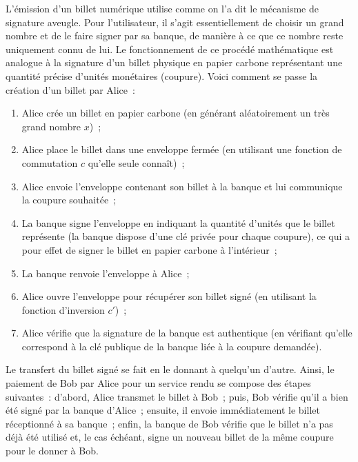L'émission d'un billet numérique utilise comme on l'a dit le mécanisme de signature aveugle. Pour l'utilisateur, il s'agit essentiellement de choisir un grand nombre et de le faire signer par sa banque, de manière à ce que ce nombre reste uniquement connu de lui. Le fonctionnement de ce procédé mathématique est analogue à la signature d'un billet physique en papier carbone représentant une quantité précise d'unités monétaires (coupure). Voici comment se passe la création d'un billet par Alice~:

\begin{enumerate}
\item Alice crée un billet en papier carbone (en générant aléatoirement un très grand nombre $x$)~;
\item Alice place le billet dans une enveloppe fermée (en utilisant une fonction de commutation $c$ qu'elle seule connaît)~;
\item Alice envoie l'enveloppe contenant son billet à la banque et lui communique la coupure souhaitée~;
\item La banque signe l'enveloppe en indiquant la quantité d'unités que le billet représente (la banque dispose d'une clé privée pour chaque coupure), ce qui a pour effet de signer le billet en papier carbone à l'intérieur~;
\item La banque renvoie l'enveloppe à Alice~;
\item Alice ouvre l'enveloppe pour récupérer son billet signé (en utilisant la fonction d'inversion $c'$)~;
\item Alice vérifie que la signature de la banque est authentique (en vérifiant qu'elle correspond à la clé publique de la banque liée à la coupure demandée).
\end{enumerate}

Le transfert du billet signé se fait en le donnant à quelqu'un d'autre. Ainsi, le paiement de Bob par Alice pour un service rendu se compose des étapes suivantes~: d'abord, Alice transmet le billet à Bob~; puis, Bob vérifie qu'il a bien été signé par la banque d'Alice~; ensuite, il envoie immédiatement le billet réceptionné à sa banque~; enfin, la banque de Bob vérifie que le billet n'a pas déjà été utilisé et, le cas échéant, signe un nouveau billet de la même coupure pour le donner à Bob.


